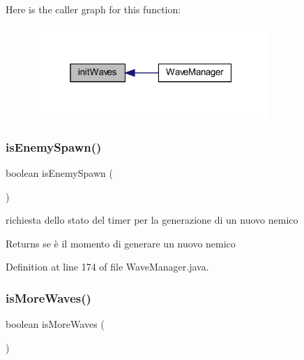 Here is the caller graph for this function\+:
\nopagebreak
\begin{figure}[H]
\begin{center}
\leavevmode
\includegraphics[width=253pt]{classmanagers_1_1_wave_manager_a6df6e01cd643c513c52431c1a86819af_icgraph}
\end{center}
\end{figure}
\mbox{\label{classmanagers_1_1_wave_manager_a121827ebd1c5b24c92f966721b51c0b9}} 
\subsubsection{\texorpdfstring{is\+Enemy\+Spawn()}{isEnemySpawn()}}
{\footnotesize\ttfamily boolean is\+Enemy\+Spawn (\begin{DoxyParamCaption}{ }\end{DoxyParamCaption})}



richiesta dello stato del timer per la generazione di un nuovo nemico 

\begin{DoxyReturn}{Returns}
se è il momento di generare un nuovo nemico 
\end{DoxyReturn}


Definition at line 174 of file Wave\+Manager.\+java.

\mbox{\label{classmanagers_1_1_wave_manager_a999f12a033f49f299ad7f55bcae24447}} 
\subsubsection{\texorpdfstring{is\+More\+Waves()}{isMoreWaves()}}
{\footnotesize\ttfamily boolean is\+More\+Waves (\begin{DoxyParamCaption}{ }\end{DoxyParamCaption})}




